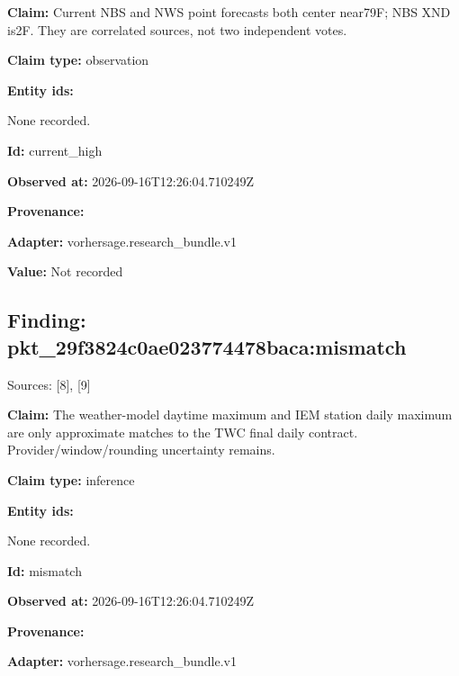 \documentclass[11pt]{article}
\begin{document}
\par\noindent\textbf{Claim:} Current NBS and NWS point forecasts both center near79F; NBS XND is2F. They are correlated sources, not two independent votes.

\par\noindent\textbf{Claim type:} observation

\par\noindent\textbf{Entity ids:} \par None recorded.

\par\noindent\textbf{Id:} current\_high

\par\noindent\textbf{Observed at:} 2026-09-16T12:26:04.710249Z

\par\noindent\textbf{Provenance:} \par \par\noindent\textbf{Adapter:} vorhersage.r\hspace{0pt}esearch\_bund\hspace{0pt}le.v1

\par\noindent\textbf{Value:} Not recorded

\subsection*{\textcolor{epdarkgreen}{Finding: pkt\_29f3824c\hspace{0pt}0ae023774478\hspace{0pt}baca:mismatc\hspace{0pt}h}}
Sources: [8], [9]


\par\noindent\textbf{Claim:} The weather-model daytime maximum and IEM station daily maximum are only approximate matches to the TWC final daily contract. Provider/window/rounding uncertainty remains.

\par\noindent\textbf{Claim type:} inference

\par\noindent\textbf{Entity ids:} \par None recorded.

\par\noindent\textbf{Id:} mismatch

\par\noindent\textbf{Observed at:} 2026-09-16T12:26:04.710249Z

\par\noindent\textbf{Provenance:} \par \par\noindent\textbf{Adapter:} vorhersage.r\hspace{0pt}esearch\_bund\hspace{0pt}le.v1
\end{document}
